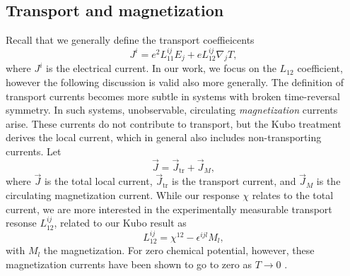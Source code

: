 \subsection{Transport and magnetization}
Recall that we generally define the transport coeffieicents
\[
J^i = e^2 L^{ij}_{11} E_j + e L_{12}^{ij} \nabla_jT,
\]
where \( J^i \) is the electrical current.
In our work, we focus on the \( L_{12} \) coefficient, however the following discussion is valid also more generally.
The definition of transport currents becomes more subtle in systems with broken time-reversal symmetry\cite{vanderwurffMagnetovorticalThermoelectricTransport2019, chernodubThermalTransportGeometry2021}.
In such systems, unobservable, circulating \emph{magnetization} currents arise.
These currents do not contribute to transport, but the Kubo treatment derives the local current, which in general also includes non-transporting currents.
Let
\begin{equation}
  \label{eq:23}
  \vec{J} = \vec{J}_{\text{tr}} + \vec{J}_M,
\end{equation}
where \( \vec{J} \) is the total local current, \( \vec{J}_{\text{tr}} \) is the transport current, and \( \vec{J}_M \) is the circulating magnetization current.
While our response \( \chi \) relates to the total current, we are more interested in the experimentally measurable transport resonse \( L^{ij}_{12} \), related to our Kubo result as
\cite{chernodubThermalTransportGeometry2021}
\begin{equation}
  \label{eq:24}
  L_{12}^{ij} = \chi^{12} - \epsilon^{ijl} M_l,
\end{equation}
with \( M_l \) the magnetization.
For zero chemical potential, however, these magnetization currents have been shown to go to zero as \( T \to 0 \) \cite{vanderwurffMagnetovorticalThermoelectricTransport2019}.


